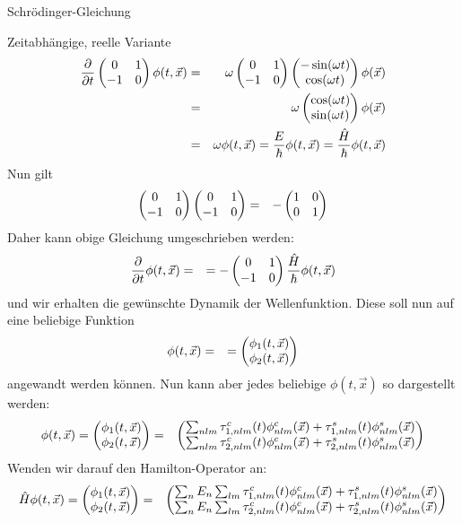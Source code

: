 \begin{chapter}{\titlestr}
\begin{section}{Schrödinger-Gleichung}
\begin{subsection}{Zeitabhängige, reelle Variante}
\begin{eqnarray*}
\frac{\partial}{\partial t} \begin{pmatrix} 0 & 1\\ -1 & 0\end{pmatrix}\phi(t,\vec{x}) &=& \omega\begin{pmatrix} 0 & 1\\ -1 & 0\end{pmatrix}\begin{pmatrix}-\sin(\omega t)\\ \cos(\omega t)\end{pmatrix}\phi(\vec{x})\\
&=& \omega\begin{pmatrix}\cos(\omega t)\\ \sin(\omega t)\end{pmatrix}\phi(\vec{x})\\
&=& \omega \phi(t,\vec{x}) =\frac{E}{\hbar} \phi(t,\vec{x}) =\frac{\hat{H}}{\hbar} \phi(t,\vec{x}) 
\end{eqnarray*}
Nun gilt
\begin{eqnarray*}
\begin{pmatrix} 0 & 1\\ -1 & 0\end{pmatrix}\begin{pmatrix} 0 & 1\\ -1 & 0\end{pmatrix} &=& -\begin{pmatrix} 1 & 0\\ 0 & 1\end{pmatrix}
\end{eqnarray*}
Daher kann obige Gleichung umgeschrieben werden:
\begin{eqnarray}
\label{schroedinger_time_1}
\frac{\partial}{\partial t} \phi(t,\vec{x}) &=&=-\begin{pmatrix} 0 & 1\\ -1 & 0\end{pmatrix}\frac{\hat{H}}{\hbar} \phi(t,\vec{x}) 
\end{eqnarray}
und wir erhalten die gewünschte Dynamik der Wellenfunktion. Diese soll nun auf eine beliebige Funktion
\begin{eqnarray*}
\phi(t,\vec{x}) &=&= \begin{pmatrix} \phi_1(t, \vec{x})\\ \phi_2(t, \vec{x})\end{pmatrix}
\end{eqnarray*}
angewandt werden können. Nun kann aber jedes beliebige $\phi(t, \vec{x})$ so dargestellt werden:
\begin{eqnarray*}
\phi(t, \vec{x})=\begin{pmatrix}\phi_1(t, \vec{x})\\ \phi_2(t, \vec{x})\end{pmatrix} &=& 
\begin{pmatrix}
\sum_{nlm} \tau^c_{1,nlm}(t)\phi^c_{nlm}(\vec{x})+\tau^s_{1,nlm}(t)\phi^s_{nlm}(\vec{x})\\
\sum_{nlm} \tau^c_{2,nlm}(t)\phi^c_{nlm}(\vec{x})+\tau^s_{2,nlm}(t)\phi^s_{nlm}(\vec{x})
\end{pmatrix}
\end{eqnarray*}
Wenden wir darauf den Hamilton-Operator an:
\begin{eqnarray*}
\hat{H}\phi(t, \vec{x})=\begin{pmatrix}\phi_1(t, \vec{x})\\ \phi_2(t, \vec{x})\end{pmatrix} &=& 
\begin{pmatrix}
\sum_{n}E_n\sum_{lm} \tau^c_{1,nlm}(t)\phi^c_{nlm}(\vec{x})+\tau^s_{1,nlm}(t)\phi^s_{nlm}(\vec{x})\\
\sum_{n}E_n\sum_{lm} \tau^c_{2,nlm}(t)\phi^c_{nlm}(\vec{x})+\tau^s_{2,nlm}(t)\phi^s_{nlm}(\vec{x})
\end{pmatrix}
\end{eqnarray*}
\end{subsection}
\end{section}
\end{chapter}
